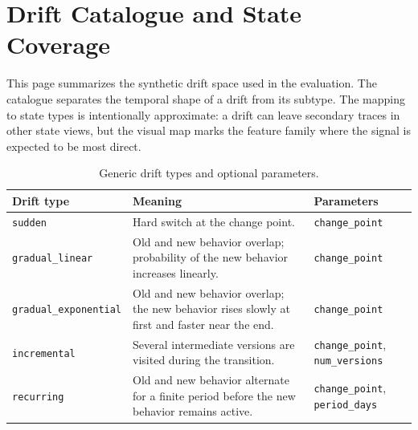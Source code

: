 \chapter{Drift Catalogue and State Coverage}
\label{chap:drift_catalogue}

This page summarizes the synthetic drift space used in the evaluation. The
catalogue separates the temporal shape of a drift from its subtype. The mapping
to state types is intentionally approximate: a drift can leave secondary traces
in other state views, but the visual map marks the feature family where the
signal is expected to be most direct.

\begin{table}[ht]
\caption{Generic drift types and optional parameters.}
\label{tab:drift_types}
\centering
\small
\setlength{\tabcolsep}{3pt}
\begin{tabular}{@{}p{}p{}p{}@{}}
\toprule
\textbf{Drift type} & \textbf{Meaning} & \textbf{Parameters} \\
\midrule
\texttt{sudden} & Hard switch at the change point. & \texttt{change\_point} \\
\texttt{gradual\_linear} & Old and new behavior overlap; probability of the new behavior increases linearly. & \texttt{change\_point} \\
\texttt{gradual\_exponential} & Old and new behavior overlap; the new behavior rises slowly at first and faster near the end. & \texttt{change\_point} \\
\texttt{incremental} & Several intermediate versions are visited during the transition. & \texttt{change\_point}, \texttt{num\_versions} \\
\texttt{recurring} & Old and new behavior alternate for a finite period before the new behavior remains active. & \texttt{change\_point}, \texttt{period\_days} \\
\bottomrule
\end{tabular}
\end{table}

